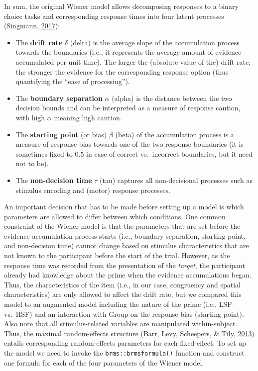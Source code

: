 \documentclass[
  11pt,
  english,
  ,doc,floatsintext]{apa6}
\begin{document}
In sum, the original Wiener model allows decomposing responses to a binary choice tasks and corresponding response times into four latent processes (Singmann, \protect\hyperlink{ref-singmann_diffusionux2fwiener_2017}{2017}):

\begin{itemize}
\item
  The \textbf{drift rate} \(\delta\) (delta) is the average slope of the accumulation process towards the boundaries (i.e., it represents the average amount of evidence accumulated per unit time). The larger the (absolute value of the) drift rate, the stronger the evidence for the corresponding response option (thus quantifying the \enquote{ease of processing}).
\item
  The \textbf{boundary separation} \(\alpha\) (alpha) is the distance between the two decision bounds and can be interpreted as a measure of response caution, with high \(\alpha\) meaning high caution.
\item
  The \textbf{starting point} (or bias) \(\beta\) (beta) of the accumulation process is a measure of response bias towards one of the two response boundaries (it is sometimes fixed to \(0.5\) in case of correct vs.~incorrect boundaries, but it need not to be).
\item
  The \textbf{non-decision time} \(\tau\) (tau) captures all non-decisional processes such as stimulus encoding and (motor) response processes.
\end{itemize}

An important decision that has to be made before setting up a model is which parameters are allowed to differ between which conditions. One common constraint of the Wiener model is that the parameters that are set before the evidence accumulation process starts (i.e., boundary separation, starting point, and non-decision time) cannot change based on stimulus characteristics that are not known to the participant before the start of the trial. However, as the response time was recorded from the presentation of the \emph{target}, the participant already had knowledge about the prime when the evidence accumulations began. Thus, the characteristics of the item (i.e., in our case, congruency and spatial characteristics) are only allowed to affect the drift rate, but we compared this model to an augmented model including the nature of the prime (i.e., LSF vs.~HSF) and an interaction with Group on the response bias (starting point). Also note that all stimulus-related variables are manipulated within-subject. Thus, the maximal random-effects structure (Barr, Levy, Scheepers, \& Tily, \protect\hyperlink{ref-barr_random_2013-1}{2013}) entails corresponding random-effects parameters for each fixed-effect. To set up the model we need to invoke the \texttt{brms::brmsformula()} function and construct one formula for each of the four parameters of the Wiener model.
\end{document}
